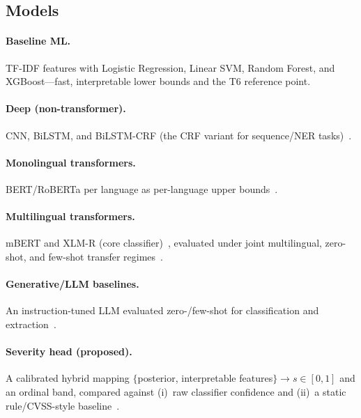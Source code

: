 \documentclass[11pt,a4paper]{article}
\begin{document}
\subsection{Models}\label{sec:method-models}
\paragraph{Baseline ML.} TF-IDF features with Logistic Regression, Linear SVM, Random
Forest, and XGBoost---fast, interpretable lower bounds and the T6 reference point.
\paragraph{Deep (non-transformer).} CNN, BiLSTM, and BiLSTM-CRF (the CRF variant for
sequence/NER tasks)~\cite{kim2020automatic}.
\paragraph{Monolingual transformers.} BERT/RoBERTa per language as per-language upper
bounds~\cite{devlin2019bert,sangher2023towards}.
\paragraph{Multilingual transformers.} mBERT and XLM-R (core
classifier)~\cite{conneau2020xlmr,vaswani2017attention}, evaluated under joint
multilingual, zero-shot, and few-shot transfer regimes~\cite{thangaraj2024crosslingual}.
\paragraph{Generative/LLM baselines.} An instruction-tuned LLM evaluated zero-/few-shot
for classification and extraction~\cite{shah2025madcti,sorokoletova2024scalable}.
\paragraph{Severity head (proposed).} A calibrated hybrid mapping
$\{$posterior, interpretable features$\}\rightarrow s\in[0,1]$ and an ordinal band,
compared against (i)~raw classifier confidence and (ii)~a static rule/CVSS-style
baseline~\cite{zeng2022licality,saklani2025severity}.

\end{document}
